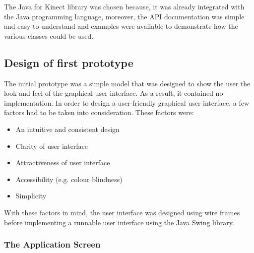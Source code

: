 \documentclass[a4paper, 12pt]{article}
\begin{document}
The Java for Kinect library was chosen because, it was already integrated with the Java programming language, moreover, the API documentation was simple and easy to understand and examples were available to demonstrate how the various classes could be used.

\subsection{Design of first prototype}
The initial prototype was a simple model that was designed to show the user the look and feel of the graphical user interface. As a result, it contained no implementation. In order to design a user-friendly graphical user interface,  a few factors had to be taken into consideration. These factors were: 

\begin{itemize}
	\item An intuitive and consistent design
	\item Clarity of user interface
	\item Attractiveness of user interface
	\item Accessibility (e.g. colour blindness) 
	\item Simplicity
\end{itemize}


With these factors in mind, the user interface was designed using wire frames before implementing a runnable user interface using the Java Swing library.

\subsubsection{The Application Screen}
\end{document}
